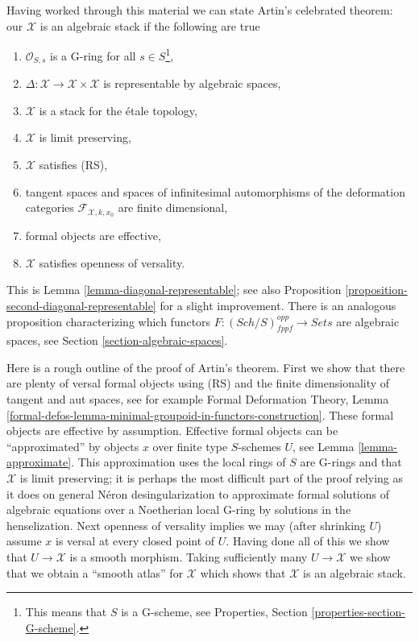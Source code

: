 \documentclass{stacks-project}
\theoremstyle{plain}
\theoremstyle{definition}
\theoremstyle{remark}
\numberwithin{equation}{subsection}
\def\Sch{\mathit{Sch}}
\begin{document}
\medskip\noindent
Having worked through this material we can state Artin's celebrated
theorem: our $\mathcal{X}$ is an algebraic stack if the following are true
\begin{enumerate}
\item $\mathcal{O}_{S, s}$ is a G-ring for all $s \in S$\footnote{This
means that $S$ is a G-scheme, see
Properties, Section \ref{properties-section-G-scheme}.},
\item $\Delta : \mathcal{X} \to \mathcal{X} \times \mathcal{X}$
is representable by algebraic spaces,
\item $\mathcal{X}$ is a stack for the \'etale topology,
\item $\mathcal{X}$ is limit preserving,
\item $\mathcal{X}$ satisfies (RS),
\item tangent spaces and spaces of infinitesimal automorphisms
of the deformation categories $\mathcal{F}_{\mathcal{X}, k, x_0}$
are finite dimensional,
\item formal objects are effective,
\item $\mathcal{X}$ satisfies openness of versality.
\end{enumerate}
This is Lemma \ref{lemma-diagonal-representable}; see also
Proposition \ref{proposition-second-diagonal-representable}
for a slight improvement. There is an analogous proposition
characterizing which functors $F : (\Sch/S)_{fppf}^{opp} \to \textit{Sets}$
are algebraic spaces, see Section \ref{section-algebraic-spaces}.

\medskip\noindent
Here is a rough outline of the proof of Artin's theorem.
First we show that there are plenty of versal formal objects
using (RS) and the finite dimensionality of tangent and aut spaces, see
for example Formal Deformation Theory, Lemma
\ref{formal-defos-lemma-minimal-groupoid-in-functors-construction}.
These formal objects are effective by assumption.
Effective formal objects can be ``approximated'' by objects $x$ over
finite type $S$-schemes $U$, see Lemma \ref{lemma-approximate}.
This approximation uses the local rings of $S$ are G-rings and
that $\mathcal{X}$ is limit preserving; it is perhaps the most difficult
part of the proof relying as it does on general N\'eron desingularization to
approximate formal solutions of algebraic equations over a Noetherian local
G-ring by solutions in the henselization.
Next openness of versality implies we may (after shrinking $U$)
assume $x$ is versal at every closed point of $U$.
Having done all of this we show that $U \to \mathcal{X}$
is a smooth morphism. Taking sufficiently many $U \to \mathcal{X}$
we show that we obtain a ``smooth atlas'' for $\mathcal{X}$ which shows
that $\mathcal{X}$ is an algebraic stack.
\end{document}
